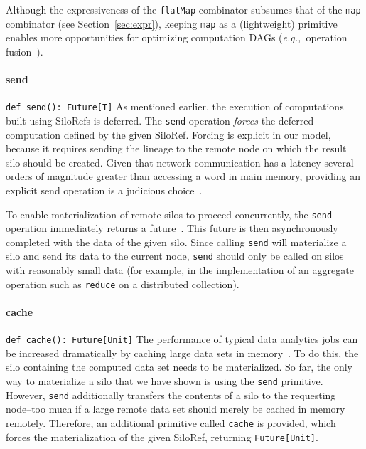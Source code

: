 \documentclass[preprint]{sigplanconf}
\theoremstyle{definition}
\theoremstyle{definition}
\newcommand{\eg}{{\em e.g.,~}}
\begin{document}
Although the expressiveness of the \verb|flatMap| combinator subsumes that of
the \verb|map| combinator (see Section~\ref{sec:expr}), keeping \verb|map| as a
(lightweight) primitive enables more opportunities for optimizing computation
DAGs (\eg operation fusion~\cite{FlumeJava}).

\paragraph{send}%
%
\texttt{def send(): Future[T]} \newline
%
As mentioned earlier, the execution of computations built using SiloRefs is
deferred. The \verb|send| operation {\em forces} the deferred computation defined
by the given SiloRef. Forcing is explicit in our model, because it requires
sending the lineage to the remote node on which the result silo should be
created. Given that network communication has a latency several orders of
magnitude greater than accessing a word in main memory, providing an explicit
send operation is a judicious choice~\cite{ANoteDistComp}.

To enable materialization of remote silos to proceed concurrently, the
\verb|send| operation immediately returns a future~\cite{Futures}. This future
is then asynchronously completed with the data of the given silo. Since calling
\verb|send| will materialize a silo and send its data to the current node,
\verb|send| should only be called on silos with reasonably small data (for
example, in the implementation of an aggregate operation such as \verb|reduce|
on a distributed collection).

\paragraph{cache}%
%
\texttt{def cache(): Future[Unit]} \newline
%
The performance of typical data analytics jobs can be increased dramatically by 
caching large data sets in memory~\cite{Spark}. To do this, the silo containing 
the computed data set needs to be materialized. So far, the only way to 
materialize a silo that we have shown is using the \verb|send| primitive. 
However, \verb|send| additionally transfers the contents of a silo to the 
requesting node--too much if a large remote data set should merely be cached in 
memory remotely.  Therefore, an additional primitive called \verb|cache| is 
provided, which forces the  materialization of the given SiloRef, 
returning \verb|Future[Unit]|.
\end{document}
